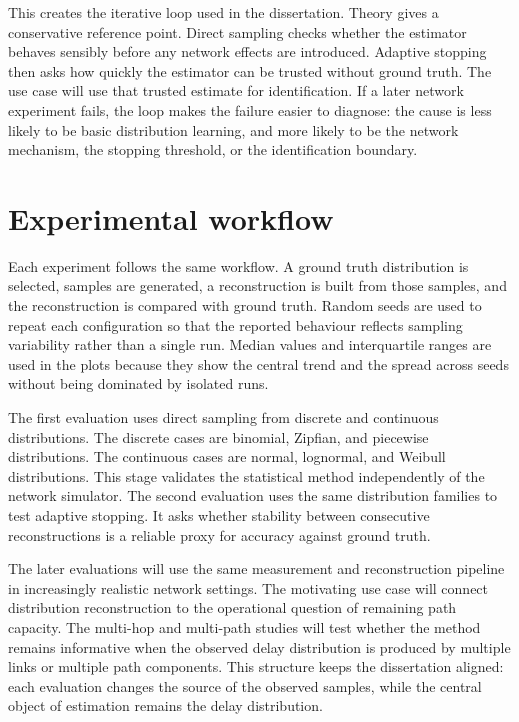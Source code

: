 \documentclass[a4paper,11pt]{report}
\begin{document}
This creates the iterative loop used in the dissertation. Theory gives a conservative reference point. Direct sampling checks whether the estimator behaves sensibly before any network effects are introduced. Adaptive stopping then asks how quickly the estimator can be trusted without ground truth. The use case will use that trusted estimate for identification. If a later network experiment fails, the loop makes the failure easier to diagnose: the cause is less likely to be basic distribution learning, and more likely to be the network mechanism, the stopping threshold, or the identification boundary.

\section{Experimental workflow}
\label{sec:method-experimental-workflow}

Each experiment follows the same workflow. A ground truth distribution is selected, samples are generated, a reconstruction is built from those samples, and the reconstruction is compared with ground truth. Random seeds are used to repeat each configuration so that the reported behaviour reflects sampling variability rather than a single run. Median values and interquartile ranges are used in the plots because they show the central trend and the spread across seeds without being dominated by isolated runs.

The first evaluation uses direct sampling from discrete and continuous distributions. The discrete cases are binomial, Zipfian, and piecewise distributions. The continuous cases are normal, lognormal, and Weibull distributions. This stage validates the statistical method independently of the network simulator. The second evaluation uses the same distribution families to test adaptive stopping. It asks whether stability between consecutive reconstructions is a reliable proxy for accuracy against ground truth.

The later evaluations will use the same measurement and reconstruction pipeline in increasingly realistic network settings. The motivating use case will connect distribution reconstruction to the operational question of remaining path capacity. The multi-hop and multi-path studies will test whether the method remains informative when the observed delay distribution is produced by multiple links or multiple path components. This structure keeps the dissertation aligned: each evaluation changes the source of the observed samples, while the central object of estimation remains the delay distribution.
\end{document}
